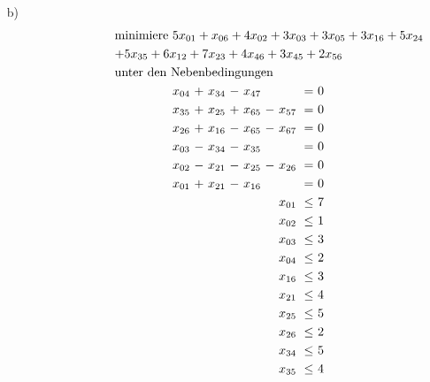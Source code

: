 \documentclass [a4paper,11pt]{article}
\begin{document}
\begin{enumerate}
\begin{enumerate}
            \item[b)]
                \begin{align*}
                \begin{alignedat}{6}
                & \text{minimiere } \rlap{$ 5x_{01}+x_{06}+4x_{02}+3x_{03}+3x_{05}+3x_{16}+5x_{24} $} &&&&&&&&&\\
                & \rlap{$ +5x_{35}+6x_{12}+7x_{23}+4x_{46}+3x_{45}+2x_{56} $} &&&&&&&&&\\
                & \rlap{unter den Nebenbedingungen} & & & & & & & & & \\
                && x_{04} &\ + &\ x_{34} &\ - &\ x_{47} &    &         &\ = &\ 0 \\
                && x_{35} &\ + &\ x_{25} &\ + &\ x_{65} &\ - &\ x_{57} &\ = &\ 0 \\
                && x_{26} &\ + &\ x_{16} &\ - &\ x_{65} &\ - &\ x_{67} &\ = &\ 0 \\
                && x_{03} &\ - &\ x_{34} &\ - &\ x_{35} &    &         &\ = &\ 0 \\
                && x_{02} &\ - &\ x_{21} &\ - &\ x_{25} &\ - &\ x_{26} &\ = &\ 0 \\
                && x_{01} &\ + &\ x_{21} &\ - &\ x_{16} &    &         &\ = &\ 0 \\
                &&        &    &         &    &         &    &\ x_{01} &\ \leq &\ 7 \\
                &&        &    &         &    &         &    &\ x_{02} &\ \leq &\ 1 \\
                &&        &    &         &    &         &    &\ x_{03} &\ \leq &\ 3 \\
                &&        &    &         &    &         &    &\ x_{04} &\ \leq &\ 2 \\
                &&        &    &         &    &         &    &\ x_{16} &\ \leq &\ 3 \\
                &&        &    &         &    &         &    &\ x_{21} &\ \leq &\ 4 \\
                &&        &    &         &    &         &    &\ x_{25} &\ \leq &\ 5 \\
                &&        &    &         &    &         &    &\ x_{26} &\ \leq &\ 2 \\
                &&        &    &         &    &         &    &\ x_{34} &\ \leq &\ 5 \\
                &&        &    &         &    &         &    &\ x_{35} &\ \leq &\ 4 \\

\end{alignedat}
\end{align*}
\end{enumerate}
\end{enumerate}
\end{document}
